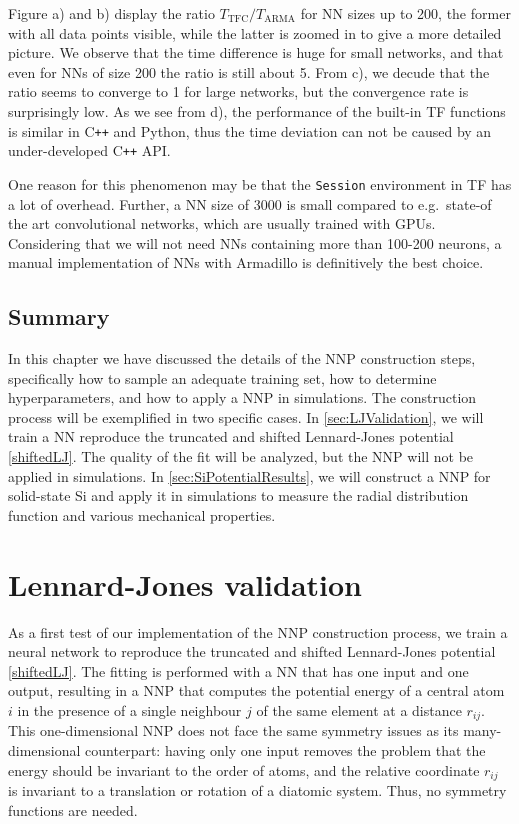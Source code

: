 \documentclass[twoside,english]{uiofysmaster}
\begin{document}
Figure a) and b) display the ratio $T_{\mathrm{TFC}}/T_{\mathrm{ARMA}}$ for NN sizes up to 200, the former with all data points 
visible, while the latter is zoomed in to give a more detailed picture. We observe that the time difference is huge 
for small networks, and that even for NNs of size 200 the ratio is still about 5. From c), we decude that the ratio seems to converge 
to 1 for large networks, but the convergence rate is surprisingly low. 
As we see from d), the performance of the built-in TF functions is similar 
in C\texttt{++} and Python, thus the time deviation can not be caused by an under-developed C\texttt{++} API. 

One reason for this phenomenon may be that the \texttt{Session} environment in TF has a lot of overhead. 
Further, a NN size of 3000 is small compared to e.g.\ state-of the art convolutional networks, which are usually trained with GPUs. 
Considering that we will not need NNs containing more than 100-200 neurons, a manual implementation of NNs with Armadillo 
is definitively the best choice. 

\section{Summary}
In this chapter we have discussed the details of the NNP construction steps, specifically how to sample an adequate training set,
how to determine hyperparameters, and how to apply a NNP in simulations. 
The construction process will be exemplified 
in two specific cases. In \autoref{sec:LJValidation}, we will train a NN reproduce the truncated and shifted 
Lennard-Jones potential \eqref{shiftedLJ}. The quality of the fit will be analyzed, but the NNP will not be applied 
in simulations. In \autoref{sec:SiPotentialResults}, we will construct a NNP for solid-state Si and apply it in simulations 
to measure the radial distribution function and various mechanical properties. 




\chapter{Lennard-Jones validation} \label{sec:LJValidation}
As a first test of our implementation of the NNP construction process, we train a neural network to reproduce 
the truncated and shifted Lennard-Jones potential \eqref{shiftedLJ}. 
The fitting is performed with a NN that has one input and one output, resulting in 
a NNP that computes the potential energy of a central atom $i$ in the presence of a single neighbour $j$ of the same element at 
a distance $r_{ij}$. This one-dimensional NNP does not face the same symmetry issues as its many-dimensional counterpart: 
having only one input removes the problem that the energy should be invariant to the order of atoms, and 
the relative coordinate $r_{ij}$ is invariant to a translation or rotation of a diatomic system. Thus, no symmetry functions 
are needed. 
\end{document}
